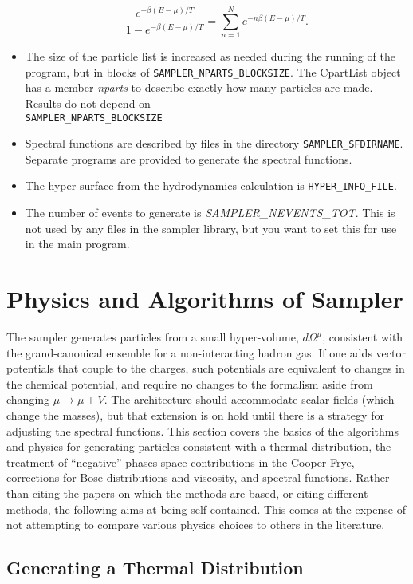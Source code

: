 \begin{itemize}
\[
\frac{e^{-\beta(E-\mu)/T}}{1-e^{-\beta(E-\mu)/T}}=\sum_{n=1}^Ne^{-n\beta(E-\mu)/T}.
\]
\item The size of the particle list is increased as needed during the running of the program, but in blocks of {\tt SAMPLER\_NPARTS\_BLOCKSIZE}. The CpartList object has a member {\it nparts} to describe exactly how many particles are made. Results do not depend on\\ {\tt SAMPLER\_NPARTS\_BLOCKSIZE}
\item Spectral functions are described by files in the directory {\tt SAMPLER\_SFDIRNAME}. Separate programs are provided to generate the spectral functions.
\item The hyper-surface from the hydrodynamics calculation is {\tt HYPER\_INFO\_FILE}.
\item The number of events to generate is {\it SAMPLER\_NEVENTS\_TOT}. This is not used by any files in the sampler library, but you want to set this for use in the main program. 
\end{itemize}


\section{Physics and Algorithms of Sampler}

The sampler generates particles from a small hyper-volume, $d\Omega^\mu$, consistent with the grand-canonical ensemble for a non-interacting hadron gas. If one adds vector potentials that couple to the charges, such potentials are equivalent to changes in the chemical potential, and require no changes to the formalism aside from changing $\mu\rightarrow\mu+V$. The architecture should accommodate scalar fields (which change the masses), but that extension is on hold until there is a strategy for adjusting the spectral functions. This section covers the basics of the algorithms and physics for generating particles consistent with a thermal distribution, the treatment of ``negative'' phases-space contributions in the Cooper-Frye, corrections for Bose distributions and viscosity, and spectral functions. Rather than citing the papers on which the methods are based, or citing different methods, the following aims at being self contained. This comes at the expense of not attempting to compare various physics choices to others in the literature.

\subsection{Generating a Thermal Distribution}

